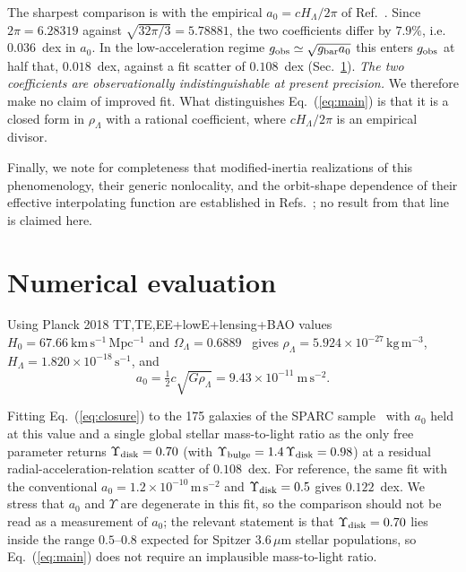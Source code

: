\documentclass[11pt]{article}
\begin{document}
The sharpest comparison is with the empirical $a_0 = cH_\Lambda/2\pi$ of Ref.~\cite{Milgrom2020}. Since
$2\pi = 6.28319$ against $\sqrt{32\pi/3} = 5.78881$, the two coefficients differ by $7.9\%$, i.e.\
$0.036$~dex in $a_0$. In the low-acceleration regime $g_{\rm obs}\simeq\sqrt{g_{\rm bar}a_0}$ this
enters $g_{\rm obs}$ at half that, $0.018$~dex, against a fit scatter of $0.108$~dex
(Sec.~\ref{sec:num}). \emph{The two coefficients are observationally indistinguishable at present
precision.} We therefore make no claim of improved fit. What distinguishes Eq.~(\ref{eq:main}) is that
it is a closed form in $\rho_\Lambda$ with a rational coefficient, where $cH_\Lambda/2\pi$ is an
empirical divisor.

Finally, we note for completeness that modified-inertia realizations of this phenomenology, their
generic nonlocality, and the orbit-shape dependence of their effective interpolating function are
established in Refs.~\cite{Milgrom1994,Milgrom2022}; no result from that line is claimed here.

\section{Numerical evaluation}
\label{sec:num}

Using Planck 2018 TT,TE,EE+lowE+lensing+BAO values $H_0 = 67.66\ \mathrm{km\,s^{-1}\,Mpc^{-1}}$ and
$\Omega_\Lambda = 0.6889$~\cite{Planck2018} gives
$\rho_\Lambda = 5.924\times10^{-27}\,\mathrm{kg\,m^{-3}}$, $H_\Lambda = 1.820\times10^{-18}\,\mathrm{s^{-1}}$,
and
\begin{equation}
a_0 = \tfrac12 c\sqrt{G\rho_\Lambda} = 9.43\times10^{-11}\ \mathrm{m\,s^{-2}} .
\end{equation}

Fitting Eq.~(\ref{eq:closure}) to the 175 galaxies of the SPARC sample~\cite{SPARC} with $a_0$ held at
this value and a single global stellar mass-to-light ratio as the only free parameter returns
$\Upsilon_{\rm disk} = 0.70$ (with $\Upsilon_{\rm bulge} = 1.4\,\Upsilon_{\rm disk} = 0.98$) at a
residual radial-acceleration-relation scatter of $0.108$~dex. For reference, the same fit with the
conventional $a_0 = 1.2\times10^{-10}\,\mathrm{m\,s^{-2}}$ and $\Upsilon_{\rm disk} = 0.5$ gives
$0.122$~dex. We stress that $a_0$ and $\Upsilon$ are degenerate in this fit, so the comparison should
not be read as a measurement of $a_0$; the relevant statement is that
$\Upsilon_{\rm disk} = 0.70$ lies inside the range $0.5$--$0.8$ expected for Spitzer $3.6\,\mu$m
stellar populations, so Eq.~(\ref{eq:main}) does not require an implausible mass-to-light ratio.
\end{document}
